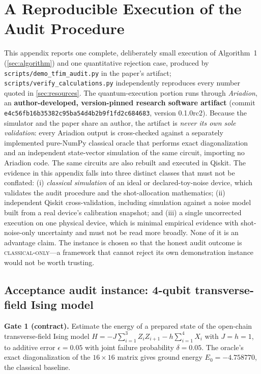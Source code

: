 \section{A Reproducible Execution of the Audit Procedure}\label{app:demo}

This appendix reports one complete, deliberately small execution of Algorithm~1 (\cref{sec:algorithm}) and one quantitative rejection case, produced by \texttt{scripts/demo\_tfim\_audit.py} in the paper's artifact; \texttt{scripts/verify\_calculations.py} independently reproduces every number quoted in \cref{sec:resources}. The quantum-execution portion runs through \emph{Ariadion}, an \textbf{author-developed, version-pinned research software artifact} (commit \texttt{e4c56fb16b35382c95ba54d4b2b9f1fd2c684683}, version 0.1.0rc2). Because the simulator and the paper share an author, the artifact is \emph{never its own sole validation}: every Ariadion output is cross-checked against a separately implemented pure-NumPy classical oracle that performs exact diagonalization and an independent state-vector simulation of the same circuit, importing no Ariadion code. The same circuits are also rebuilt and executed in Qiskit. The evidence in this appendix falls into three distinct classes that must not be conflated: (i) \emph{classical simulation} of an ideal or declared-toy-noise device, which validates the audit procedure and the shot-allocation mathematics; (ii) independent Qiskit cross-validation, including simulation against a noise model built from a real device's calibration snapshot; and (iii) a single uncorrected execution on one physical device, which is minimal empirical evidence with shot-noise-only uncertainty and must not be read more broadly. None of it is an advantage claim. The instance is chosen so that the honest audit outcome is \textsc{classical-only}---a framework that cannot reject its own demonstration instance would not be worth trusting.

\subsection{Acceptance audit instance: 4-qubit transverse-field Ising model}

\textbf{Gate 1 (contract).} Estimate the energy of a prepared state of the open-chain transverse-field Ising model $H=-J\sum_{i=1}^{3}Z_iZ_{i+1}-h\sum_{i=1}^{4}X_i$ with $J=h=1$, to additive error $\epsilon=0.05$ with joint failure probability $\delta=0.05$. The oracle's exact diagonalization of the $16\times16$ matrix gives ground energy $E_0=-4.758770$, the classical baseline.

